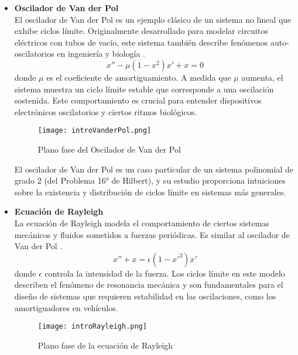 \begin{itemize}
	\item \textbf{Oscilador de Van der Pol}\\

	El oscilador de Van der Pol es un ejemplo clásico de un sistema no lineal que exhibe ciclos límite. Originalmente desarrollado para modelar circuitos eléctricos con tubos de vacío, este sistema también describe fenómenos auto-oscilatorios en ingeniería y biología \cite{vanderpol1926forced}.
	\begin{equation}
		x''-\mu \left(1-x^2\right)x'+x=0
	\end{equation}
	donde $\mu$ es el coeficiente de amortiguamiento. A medida que $\mu$ aumenta, el sistema muestra un ciclo límite estable que corresponde a una oscilación sostenida. Este comportamiento es crucial para entender dispositivos electrónicos oscilatorios y ciertos ritmos biológicos.

	\begin{figure}[h]
		\centering
		\texttt{[image: introVanderPol.png]}
		\caption{Plano fase del Oscilador de Van der Pol}
        \label{fig:introVanderPol}
	\end{figure}

	El oscilador de Van der Pol es un caso particular de un sistema polinomial de grado 2 (del Problema 16° de Hilbert), y su estudio proporciona intuiciones sobre la existencia y distribución de ciclos límite en sistemas más generales.

	\newpage

	\item \textbf{Ecuación de Rayleigh}\\

	La ecuación de Rayleigh modela el comportamiento de ciertos sistemas mecánicos y fluidos sometidos a fuerzas periódicas. Es similar al oscilador de Van der Pol \cite{rayleigh1883theory}.
	\begin{equation}
		x''+x=\epsilon\left(1-x'^2\right)x'
	\end{equation}
	donde $\epsilon$ controla la intensidad de la fuerza. Los ciclos límite en este modelo describen el fenómeno de resonancia mecánica y son fundamentales para el diseño de sistemas que requieren estabilidad en las oscilaciones, como los amortiguadores en vehículos.

	\begin{figure}[h]
		\centering
		\texttt{[image: introRayleigh.png]}
		\caption{Plano fase de la ecuación de Rayleigh}
        \label{fig:introRayleigh}
	\end{figure}


\end{itemize}
